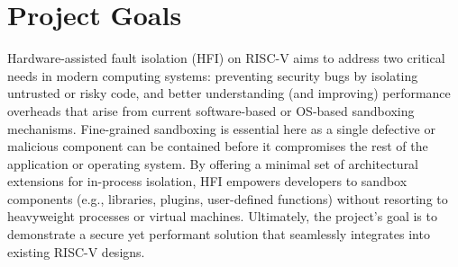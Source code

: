 \documentclass[conference,compsoc]{IEEEtran}
\begin{document}




\maketitle






%
\IEEEpeerreviewmaketitle


\section{Project Goals}
Hardware-assisted fault isolation (HFI) on RISC-V aims to address two critical needs in modern computing systems: preventing security bugs by isolating untrusted or risky code, and better understanding (and improving) performance overheads that arise from current software-based or OS-based sandboxing mechanisms. Fine-grained sandboxing is essential here as a single defective or malicious component can be contained before it compromises the rest of the application or operating system. By offering a minimal set of architectural extensions for in-process isolation, HFI empowers developers to sandbox components (e.g., libraries, plugins, user-defined functions) without resorting to heavyweight processes or virtual machines. Ultimately, the project's goal is to demonstrate a secure yet performant solution that seamlessly integrates into existing RISC-V designs.
\end{document}
